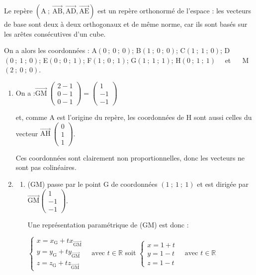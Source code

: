 \documentclass[10pt]{article}
\providecommand{\R}{\mathbb{R}}
\providecommand{\vectt}[1]{\overrightarrow{\mathrm{#1}}}
\begin{document}
\medskip

Le repère $\left(\mathrm{A} ~;~ \vectt{AB}, \vectt{AD}, \vectt{AE}\right)$ est un repère orthonormé de l'espace : les vecteurs de base sont deux à deux orthogonaux et de même norme, car ils sont basés sur les arêtes consécutives d'un cube.

On a alors les coordonnées : A$(0~;~0~;~0)$; \quad  B$(1~;~0~;~0)$; \quad  C$(1~;~1~;~0)$; \quad  D$(0~;~1~;~0)$; \quad  E$(0~;~0~;~1)$; \quad  F$(1~;~0~;~1)$; \quad  G$(1~;~1~;~1)$; \quad  H$(0~;~1~;~1)$ ~~et ~~ M$(2~;~0~;~0)$.

\begin{enumerate}
		\item On a :\quad $\vectt{GM}~\begin{pmatrix}2 - 1\\0-1\\0-1\end{pmatrix}= \begin{pmatrix}1\\-1\\-1\end{pmatrix}$

		et, comme A est l'origine du repère, les coordonnées de H sont aussi celles du vecteur $\vectt{AH} ~\begin{pmatrix}0\\1\\1\end{pmatrix}$.

		Ces coordonnées sont clairement non proportionnelles, donc les vecteurs ne sont pas colinéaires.

		\item
		\begin{enumerate}
			\item (GM) passe par le point G de coordonnées $(1~;~1~;~1)$ et est dirigée par $\vectt{GM}\begin{pmatrix}1\\-1\\-1\end{pmatrix}$.

			Une représentation paramétrique de (GM) est donc :

			$\left\{\begin{array}{l}x = x_{\mathrm{G}} + tx_{\vectt{GM}}\\y = y_{\mathrm{G}} + ty_{\vectt{GM}}\\z = z_{\mathrm{G}} + tz_{\vectt{GM}}\end{array}\right. \quad \text{avec } t \in \R$ \qquad soit \qquad
			$\left\{\begin{array}{l}x = 1 + t\\y = 1 - t\\z = 1 - t\end{array}\right. \quad \text{avec } t \in \R$


\end{enumerate}
\end{enumerate}
\end{document}
